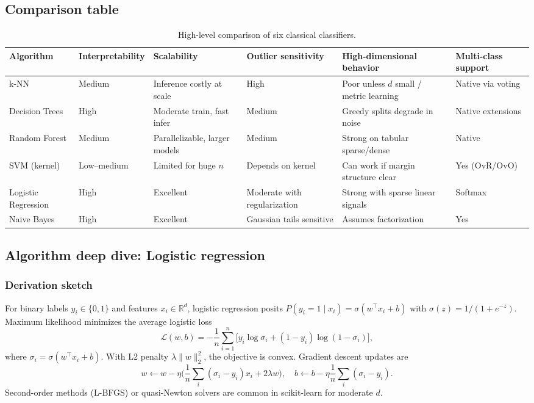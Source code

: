 \documentclass[11pt,a4paper]{article}
\begin{document}
\subsection{Comparison table}
\begin{table}[htbp]
\centering
\caption{High-level comparison of six classical classifiers.}
\label{tab:classical-compare}
\begin{tabularx}{\textwidth}{@{}lXXXXX@{}}
\toprule
Algorithm & Interpretability & Scalability & Outlier sensitivity & High-dimensional behavior & Multi-class support \\
\midrule
k-NN & Medium & Inference costly at scale & High & Poor unless $d$ small / metric learning & Native via voting \\ \addlinespace
Decision Trees & High & Moderate train, fast infer & Medium & Greedy splits degrade in noise & Native extensions \\ \addlinespace
Random Forest & Medium & Parallelizable, larger models & Medium & Strong on tabular sparse/dense & Native \\ \addlinespace
SVM (kernel) & Low--medium & Limited for huge $n$ & Depends on kernel & Can work if margin structure clear & Yes (OvR/OvO) \\ \addlinespace
Logistic Regression & High & Excellent & Moderate with regularization & Strong with sparse linear signals & Softmax \\ \addlinespace
Naive Bayes & High & Excellent & Gaussian tails sensitive & Assumes factorization & Yes \\
\bottomrule
\end{tabularx}
\end{table}

\subsection{Algorithm deep dive: Logistic regression}

\subsubsection{Derivation sketch}
For binary labels $y_i \in \{0,1\}$ and features $x_i \in \mathbb{R}^d$, logistic regression posits $P(y_i{=}1 \mid x_i) = \sigma(w^\top x_i + b)$ with $\sigma(z) = 1/(1+e^{-z})$. Maximum likelihood minimizes the average logistic loss
\begin{equation}
\mathcal{L}(w,b) = -\frac{1}{n}\sum_{i=1}^n \Big[y_i \log \sigma_i + (1-y_i)\log(1-\sigma_i)\Big],
\end{equation}
where $\sigma_i = \sigma(w^\top x_i + b)$. With L2 penalty $\lambda\|w\|_2^2$, the objective is convex. Gradient descent updates are
\begin{equation}
w \leftarrow w - \eta \Big(\frac{1}{n}\sum_i (\sigma_i - y_i)x_i + 2\lambda w\Big),\quad
b \leftarrow b - \eta \frac{1}{n}\sum_i (\sigma_i - y_i).
\end{equation}
Second-order methods (L-BFGS) or quasi-Newton solvers are common in scikit-learn for moderate $d$.
\end{document}
